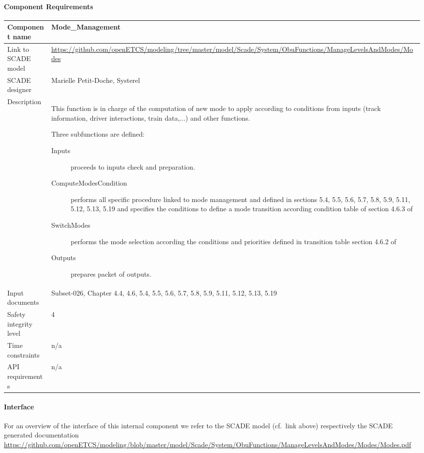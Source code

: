 
\paragraph{Component Requirements}

\begin{longtable}{p{}p{}}
\toprule
Component name			& Mode\_Management \\
\midrule
Link to SCADE model		& {\footnotesize \url{https://github.com/openETCS/modeling/tree/master/model/Scade/System/ObuFunctions/ManageLevelsAndModes/Modes}} \\
\midrule
SCADE designer			& Marielle Petit-Doche, Systerel \\
\midrule
Description				& This function is in charge of the computation of new mode to apply according to conditions from inputs (track information, driver interactions, train data,...) and other functions.

Three subfunctions are defined:
\begin{description}
\item[Inputs] proceeds to inputs check and preparation.
\item[ComputeModesCondition] performs all specific procedure linked to mode management and defined in  \citep{subset-026} sections 5.4, 5.5, 5.6, 5.7, 5.8, 5.9, 5.11, 5.12, 5.13, 5.19 and specifies the conditions to define a mode transition according condition table of section 4.6.3 of \citep{subset-026}
\item[SwitchModes] performs the mode selection according the conditions and priorities defined in transition table  section 4.6.2 of \citep{subset-026}
\item[Outputs] prepares packet of outputs.
\end{description} \\
\midrule
Input documents	& 
Subset-026, Chapter 4.4, 4.6, 5.4, 5.5, 5.6, 5.7, 5.8, 5.9, 5.11, 5.12, 5.13, 5.19 \\
\midrule
Safety integrity level		& 4 \\
\midrule
Time constraints		& n/a \\
\midrule
API requirements 		&  n/a \\
\bottomrule
\end{longtable}


\paragraph{Interface}

For an overview of the interface of this internal component we refer to the SCADE model (cf.~link above) respectively the SCADE generated documentation \url{https://github.com/openETCS/modeling/blob/master/model/Scade/System/ObuFunctions/ManageLevelsAndModes/Modes/Modes.pdf}